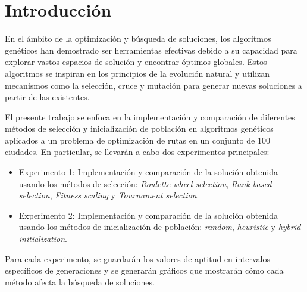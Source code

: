 \section{Introducción}

En el ámbito de la optimización y búsqueda de soluciones, los algoritmos genéticos han demostrado ser herramientas efectivas debido a su capacidad para explorar vastos espacios de solución y encontrar óptimos globales. Estos algoritmos se inspiran en los principios de la evolución natural y utilizan mecanismos como la selección, cruce y mutación para generar nuevas soluciones a partir de las existentes.

\vspace{1em} 
El presente trabajo se enfoca en la implementación y comparación de diferentes métodos de selección y inicialización de población en algoritmos genéticos aplicados a un problema de optimización de rutas en un conjunto de 100 ciudades. En particular, se llevarán a cabo dos experimentos principales:

\begin{itemize}
\item Experimento 1: Implementación y comparación de la solución obtenida usando los métodos de selección: {\it Roulette wheel selection}, {\it Rank-based selection}, {\it Fitness scaling} y {\it Tournament selection}.
\item Experimento 2: Implementación y comparación de la solución obtenida usando los métodos de inicialización de población: {\it random}, {\it heuristic} y {\it hybrid initialization}.
\end{itemize}

Para cada experimento, se guardarán los valores de aptitud en intervalos específicos de generaciones y se generarán gráficos que mostrarán cómo cada método afecta la búsqueda de soluciones. 

